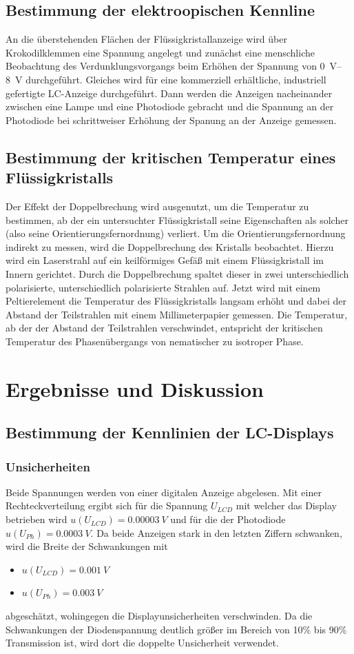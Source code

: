 \documentclass[
	a4paper,
	12pt,
	pagesize,
	ngerman
]{scrartcl}
\begin{document}
	\subsection{Bestimmung der elektroopischen Kennline}
	An die überstehenden Flächen der Flüssigkristallanzeige wird über Krokodilklemmen eine Spannung angelegt und zunächst eine menschliche Beobachtung des Verdunklungsvorgangs beim Erhöhen der Spannung von \SIrange{0}{8}{V} durchgeführt.
	Gleiches wird für eine kommerziell erhältliche, industriell gefertigte LC-Anzeige durchgeführt.
	Dann werden die Anzeigen nacheinander zwischen eine Lampe und eine Photodiode gebracht und die Spannung an der Photodiode bei schrittweiser Erhöhung der Spanung an der Anzeige gemessen.

	\subsection{Bestimmung der kritischen Temperatur eines Flüssigkristalls}
	Der Effekt der Doppelbrechung wird ausgenutzt, um die Temperatur zu bestimmen, ab der ein untersuchter Flüssigkristall seine Eigenschaften als solcher (also seine Orientierungsfernordnung) verliert.
	Um die Orientierungsfernordnung indirekt zu messen, wird die Doppelbrechung des Kristalls beobachtet.
	Hierzu wird ein Laserstrahl auf ein keilförmiges Gefäß mit einem Flüssigkristall im Innern gerichtet.
	Durch die Doppelbrechung spaltet dieser in zwei unterschiedlich polarisierte, unterschiedlich polarisierte Strahlen auf.
	Jetzt wird mit einem Peltierelement die Temperatur des Flüssigkristalls langsam erhöht und dabei der Abstand der Teilstrahlen mit einem Millimeterpapier gemessen.
	Die Temperatur, ab der der Abstand der Teilstrahlen verschwindet, entspricht der kritischen Temperatur des Phasenübergangs von nematischer zu isotroper Phase.

	\section{Ergebnisse und Diskussion}
	\subsection{Bestimmung der Kennlinien der LC-Displays}
	\subsubsection{Unsicherheiten}
	Beide Spannungen werden von einer digitalen Anzeige abgelesen.
	Mit einer Rechteckverteilung ergibt sich für die Spannung $U_{LCD}$ mit welcher das Display betrieben wird $u(U_{LCD})=\SI{0.00003}{V}$ und für die der Photodiode $u(U_{Ph})=\SI{0.0003}{V}$.
	Da beide Anzeigen stark in den letzten Ziffern schwanken, wird die Breite der Schwankungen mit
	\begin{itemize}
		\item $u(U_{LCD})=\SI{0.001}{V}$
		\item $u(U_{Ph})=\SI{0.003}{V}$
	\end{itemize}
	abgeschätzt, wohingegen die Displayunsicherheiten verschwinden.
	Da die Schwankungen der Diodenspannung deutlich größer im Bereich von 10\% bis 90\% Transmission ist, wird dort die doppelte Unsicherheit verwendet.
\end{document}
